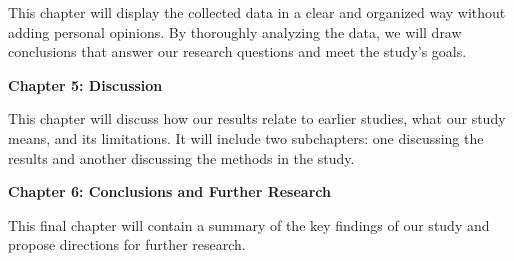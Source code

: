 This chapter will display the collected data in a clear and organized way without adding personal opinions. By thoroughly analyzing the data, we will draw conclusions that answer our research questions and meet the study's goals.


\textbf{Chapter 5: Discussion}


This chapter will discuss how our results relate to earlier studies, what our study means, and its limitations. It will include two subchapters: one discussing the results and another discussing the methods in the study.  

 
\textbf{Chapter 6: Conclusions and Further Research}

This final chapter will contain a summary of the key findings of our study and propose directions for further research.  